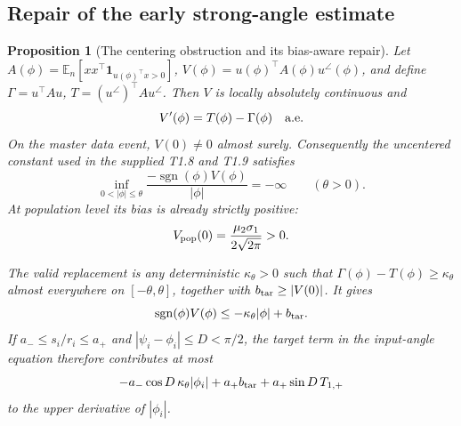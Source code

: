 \documentclass{article} %
\theoremstyle{plain}
\newtheorem{proposition}[theorem]{Proposition}
\theoremstyle{definition}
\theoremstyle{remark}
\begin{document}
\subsection{Repair of the early strong-angle estimate}
\begin{proposition}[The centering obstruction and its bias-aware repair]
\label{sbnew:bias}
Let $A(\phi)=\mathbb E_n[xx^\top\mathbf1_{u(\phi)^\top x>0}]$,
$V(\phi)=u(\phi)^\top A(\phi)u^\angle(\phi)$, and define
$\Gamma=u^\top Au$, $T=(u^\angle)^\top Au^\angle$.
Then $V$ is locally absolutely continuous and
\begin{equation}\label{sbnew:target-derivative}
 V'(\phi)=T(\phi)-\Gamma(\phi)\quad\hbox{a.e.}
\end{equation}
On the master data event, $V(0)\ne0$ almost surely. Consequently the
uncentered constant used in the supplied T1.8 and T1.9 satisfies
\begin{equation}\label{sbnew:bad-centering}
 \inf_{0<|\phi|\le\theta}
 \frac{-\operatorname{sgn}(\phi)V(\phi)}{|\phi|}=-\infty
 \qquad(\theta>0).
\end{equation}
At population level its bias is already strictly positive:
\begin{equation}\label{sbnew:population-bias}
 V_{\rm pop}(0)=\frac{\mu_2\sigma_1}{2\sqrt{2\pi}}>0.
\end{equation}

The valid replacement is any deterministic $\kappa_\theta>0$ such that
$\Gamma(\phi)-T(\phi)\ge\kappa_\theta$ almost everywhere on
$[-\theta,\theta]$, together with $b_{\rm tar}\ge|V(0)|$. It gives
\begin{equation}\label{sbnew:bias-coercivity}
 \operatorname{sgn}(\phi)V(\phi)
 \le-\kappa_\theta|\phi|+b_{\rm tar}.
\end{equation}
If $a_\mathrm{-}\le s_i/r_i\le a_\mathrm{+}$ and
$|\psi_i-\phi_i|\le D<\pi/2$, the target term in the input-angle equation
therefore contributes at most
\[
 -a_\mathrm{-}\cos D\,\kappa_\theta|\phi_i|
 +a_\mathrm{+}b_{\rm tar}
 +a_\mathrm{+}\sin D\,T_{1,+}
\]
to the upper derivative of $|\phi_i|$.
\end{proposition}
\end{document}
